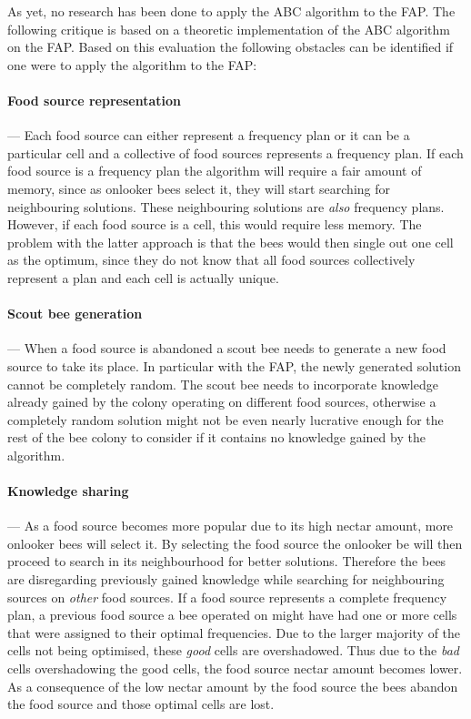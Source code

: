 As yet, no research has been done to apply the \gls{ABC} algorithm to the \gls{FAP}. The following critique is based on a theoretic implementation of the \gls{ABC} algorithm on the \gls{FAP}. Based on this evaluation the following obstacles can be identified if one were to apply the algorithm to the \gls{FAP}:
\paragraph{Food source representation}
--- Each food source can either represent a frequency plan or it can be a particular cell and a collective of food sources represents a frequency plan. If each food source is a frequency plan the algorithm will require a fair amount of memory, since as onlooker bees select it, they will start searching for neighbouring solutions. These neighbouring solutions are \emph{also} frequency plans. However, if each food source is a cell, this would require less memory. The problem with the latter approach is that the bees would then single out one cell as the optimum, since they do not know that all food sources collectively represent a plan and each cell is actually unique.
\paragraph{Scout bee generation}
--- When a food source is abandoned a scout bee needs to generate a new food source to take its place. In particular with the \gls{FAP}, the newly generated solution cannot be completely random. The scout bee needs to incorporate knowledge already gained by the colony operating on different food sources, otherwise a completely random solution might not be even nearly lucrative enough for the rest of the bee colony to consider if it contains no knowledge gained by the algorithm.
\paragraph{Knowledge sharing}
--- As a food source becomes more popular due to its high nectar amount, more onlooker bees will select it. By selecting the food source the onlooker be will then proceed to search in its neighbourhood for better solutions. Therefore the bees are disregarding previously gained knowledge while searching for neighbouring sources on \emph{other} food sources. If a food source represents a complete frequency plan, a previous food source a bee operated on might have had one or more cells that were assigned to their optimal frequencies. Due to the larger majority of the cells not being optimised, these \emph{good} cells are overshadowed. Thus due to the \emph{bad} cells overshadowing the good cells, the food source nectar amount becomes lower. As a consequence of the low nectar amount by the food source the bees abandon the food source and those optimal cells are lost.

